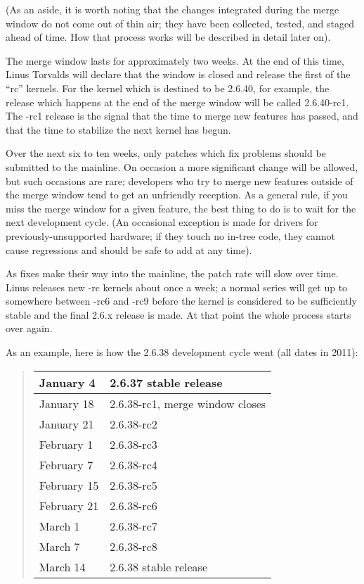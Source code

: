 \documentclass[a4paper,8pt,english]{sphinxmanual}
\begin{document}
(As an aside, it is worth noting that the changes integrated during the
merge window do not come out of thin air; they have been collected, tested,
and staged ahead of time.  How that process works will be described in
detail later on).

The merge window lasts for approximately two weeks.  At the end of this
time, Linus Torvalds will declare that the window is closed and release the
first of the ``rc'' kernels.  For the kernel which is destined to be 2.6.40,
for example, the release which happens at the end of the merge window will
be called 2.6.40-rc1.  The -rc1 release is the signal that the time to
merge new features has passed, and that the time to stabilize the next
kernel has begun.

Over the next six to ten weeks, only patches which fix problems should be
submitted to the mainline.  On occasion a more significant change will be
allowed, but such occasions are rare; developers who try to merge new
features outside of the merge window tend to get an unfriendly reception.
As a general rule, if you miss the merge window for a given feature, the
best thing to do is to wait for the next development cycle.  (An occasional
exception is made for drivers for previously-unsupported hardware; if they
touch no in-tree code, they cannot cause regressions and should be safe to
add at any time).

As fixes make their way into the mainline, the patch rate will slow over
time.  Linus releases new -rc kernels about once a week; a normal series
will get up to somewhere between -rc6 and -rc9 before the kernel is
considered to be sufficiently stable and the final 2.6.x release is made.
At that point the whole process starts over again.

As an example, here is how the 2.6.38 development cycle went (all dates in
2011):
\begin{quote}

\begin{tabulary}{\linewidth}{|L|L|}
\hline

January 4
 & 
2.6.37 stable release
\\
\hline
January 18
 & 
2.6.38-rc1, merge window closes
\\
\hline
January 21
 & 
2.6.38-rc2
\\
\hline
February 1
 & 
2.6.38-rc3
\\
\hline
February 7
 & 
2.6.38-rc4
\\
\hline
February 15
 & 
2.6.38-rc5
\\
\hline
February 21
 & 
2.6.38-rc6
\\
\hline
March 1
 & 
2.6.38-rc7
\\
\hline
March 7
 & 
2.6.38-rc8
\\
\hline
March 14
 & 
2.6.38 stable release
\\
\hline\end{tabulary}

\end{quote}
\end{document}
